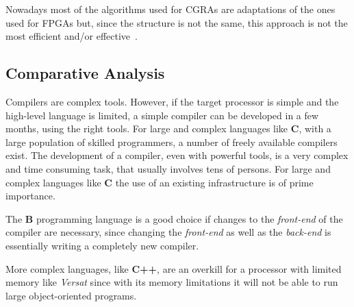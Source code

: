 




Nowadays most of the algorithms used for {\sc CGRAs} are adaptations of the ones
used for {\sc FPGAs} but, since the structure is not the same, this approach is
not the most efficient and/or effective~\cite{Chen14}.


\subsection{Comparative Analysis}

Compilers are complex tools.  However, if the target processor is simple and the
high-level language is limited, a simple compiler can be developed in a few
months, using the right tools.  For large and complex languages like {\bf C},
with a large population of skilled programmers, a number of freely available
compilers exist.  The development of a compiler, even with powerful tools, is a
very complex and time consuming task, that usually involves tens of persons.
For large and complex languages like {\bf C} the use of an existing
infrastructure is of prime importance.

The {\bf B} programming language is a good choice if changes to the {\it front-end} of
the compiler are necessary, since changing the {\it front-end} as well as the {\it back-end}
is essentially writing a completely new compiler.

More complex languages, like {\bf C++}, are an overkill for a processor with
limited memory like {\it Versat} since with its memory limitations it will not
be able to run large object-oriented programs.

